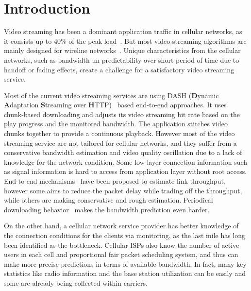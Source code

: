 \section{Introduction}
\label{sec:intro}

Video streaming has been a dominant application traffic in cellular networks, as
it consists up to 40\% of the peak load~\cite{LTENetwork, VideoMeasureatt}.
But most video streaming algorithms are mainly designed for wireline
networks~\cite{BBA, QDASH, Festive}. Unique characteristics from the cellular
networks, such as bandwidth un-predictability over short period of time due to
handoff or fading effects, create a challenge for a satisfactory video streaming
service. 

Most of the current video streaming services are using DASH (\textbf{D}ynamic
\textbf{A}daptation \textbf{S}treaming over \textbf{H}TTP)~\cite{DASH} based
end-to-end approaches. It uses chunk-based downloading and adjusts its video
streaming bit rate based on the play progress and the monitored bandwidth. The
application stitches video chunks together to provide a continuous playback.
However most of the video streaming service are not tailored for cellular networks, and they suffer from a conservative bandwidth estimation and video quality oscillation due to a lack of knowledge for the network condition. 
Some low layer connection information such as signal information is hard to access from application layer without root access.
End-to-end mechanisms~\cite{Sprout, QDASH, Festive} have been proposed to estimate link throughput, however some aims to reduce the packet delay while trading off the throughput, while others are making conservative and rough estimation. Periodical downloading behavior~\cite{OnOff} makes the bandwidth prediction even harder.

On the other hand, a cellular network service provider has better knowledge of the connection
conditions for the clients via monitoring, as the last mile has long been identified as the
bottleneck\cite{LASTMILE}. Cellular ISPs also know the number of
active users in each cell and proportional fair packet scheduling system, and thus can make more
precise predictions in terms of available bandwidth. In fact, many key statistics like radio information and the base station utilization can be easily and some are
already being collected within carriers. 

